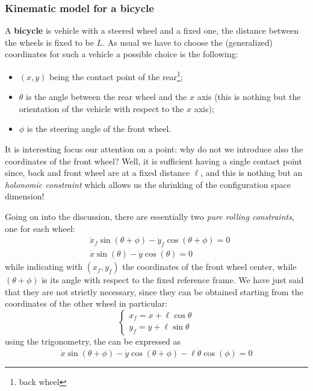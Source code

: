 \subsubsection{Kinematic model for a bicycle}
A \textbf{bicycle} is vehicle with a steered wheel and a fixed one, the distance between the wheels is fixed to be $L$. As usual we have to choose the (generalized) coordinates for such a vehicle a possible choice is the following:
\begin{itemize}
    \itemsep-0.3em
    \item $(x,y)$ being the contact point of the rear\footnote{
        back wheel
    }; 
    \item $\theta$ is the angle between the rear wheel and the $x$ axis (this is nothing but the orientation of the vehicle with respect to the $x$ axis); 
    \item $\phi$ is the steering angle of the front wheel.
\end{itemize}
\begin{remark}
    It is interesting focus our attention on a point: why do not we introduce also the coordinates of the front wheel? Well, it is sufficient having a single contact point since, back and front wheel are at a fixed distance $\ell$, and this is nothing but an \textit{holonomic constraint} which allows us the shrinking of the configuration space dimension! 
\end{remark}
Going on into the discussion, there are essentially two \textit{pure rolling constraints}, one for each wheel: 
\begin{align}
    &\dot{x}_f \sin(\theta+\phi)-\dot{y}_f \cos(\theta+\phi)=0 \label{eq:front_pure_rolling}\\
    &\dot{x}\sin(\theta)-\dot{y}\cos(\theta)=0
\end{align}
while indicating with $(x_f,y_f)$ the coordinates of the front wheel center, while $(\theta+\phi)$ is its angle with respect to the fixed reference frame. We have just said that they are not strictly necessary, since they can be obtained starting from the coordinates of the other wheel in particular: 
\begin{equation}
    \begin{cases}
        x_f=x+\ell\cos\theta\\
        y_f=y+\ell\sin\theta
    \end{cases}
\end{equation} 
using the trigonometry, the  can be expressed as
\begin{equation}
    \dot{x}\sin(\theta+\phi)-\dot{y}\cos(\theta+\phi)-\ell\dot{\theta}\cos(\phi)=0
\end{equation}
